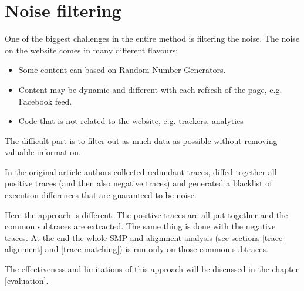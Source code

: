 



\section{Noise filtering}

One of the biggest challenges in the entire method is filtering the noise.
The noise on the website comes in many different flavours:
\begin{itemize}
  \item Some content can based on Random Number Generators.
  \item Content may be dynamic and different with each refresh of the page, e.g. Facebook feed.
  \item Code that is not related to the website, e.g. trackers, analytics
\end{itemize}

The difficult part is to filter out as much data as possible without removing valuable information.

In the original article authors collected redundant traces, diffed together all positive traces (and then also negative traces)
and generated a blacklist of execution differences that are guaranteed to be noise.

Here the approach is different. The positive traces are all put together and the common subtraces are extracted.
The same thing is done with the negative traces. 
At the end the whole SMP and alignment analysis (see sections \ref{trace-alignment} and \ref{trace-matching}) 
is run only on those common subtraces.

The effectiveness and limitations of this approach will be discussed in the chapter \ref{evaluation}.



